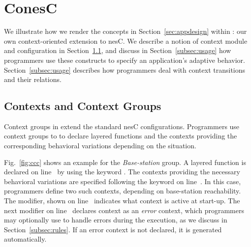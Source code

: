 
\section{ConesC}\label{sec:conesc}


We illustrate how we render the concepts in
Section~\ref{sec:appdesign} within \conesc: our own context-oriented
extension to nesC.  We describe a notion of context module and
configuration in Section~\ref{subsec:components}, and discuss in
Section~\ref{subsec:usage} how programmers use these constructs to
specify an application's adaptive behavior.
Section~\ref{subsec:usage} describes how \conesc programmers deal with
context transitions and their relations.

\subsection{Contexts and Context Groups}\label{subsec:components}


Context groups in \conesc extend the standard nesC
configurations. Programmers use context groups to to declare layered
functions and the contexts providing the corresponding behavioral
variations depending on the situation. 

Fig.~\ref{fig:ccc} shows an example for the \emph{Base-station}
group. A layered  function is declared on
line~ by using the keyword . The
contexts providing the necessary behavioral variations are specified
following the keyword  on line~. In
this case, programmers define two such contexts, depending on
base-station reachability. The  modifier, shown on
line~ indicates what context is active at
start-up. The next  modifier on line~
declares context  as an \emph{error} context, which
programmers may optionally use to handle errors during the execution,
as we discuss in Section~\ref{subsec:rules}. If an error context is
not declared, it is generated automatically.

